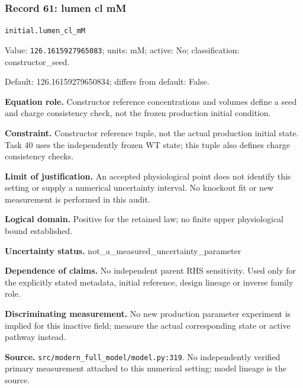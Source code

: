 \subsubsection*{Record 61: lumen cl mM}
{\small \nolinkurl{initial.lumen_cl_mM}\par

Value: \texttt{126.1615927965083}; units: mM; active: No; classification: constructor\_seed.\par

Default: 126.16159279650834; differs from default: False.\par

\textbf{Equation role.} Constructor reference concentrations and volumes define a seed and charge consistency check, not the frozen production initial condition.\par

\textbf{Constraint.} Constructor reference tuple, not the actual production initial state. Task 40 uses the independently frozen WT state; this tuple also defines charge consistency checks.\par

\textbf{Limit of justification.} An accepted physiological point does not identify this setting or supply a numerical uncertainty interval. No knockout fit or new measurement is performed in this audit.\par

\textbf{Logical domain.} Positive for the retained law; no finite upper physiological bound established.\par

\textbf{Uncertainty status.} not\_a\_measured\_uncertainty\_parameter\par

\textbf{Dependence of claims.} No independent parent RHS sensitivity. Used only for the explicitly stated metadata, initial reference, design lineage or inverse family role.\par

\textbf{Discriminating measurement.} No new production parameter experiment is implied for this inactive field; measure the actual corresponding state or active pathway instead.\par

\textbf{Source.} \nolinkurl{src/modern_full_model/model.py:319}. No independently verified primary measurement attached to this numerical setting; model lineage is the source.\par}

